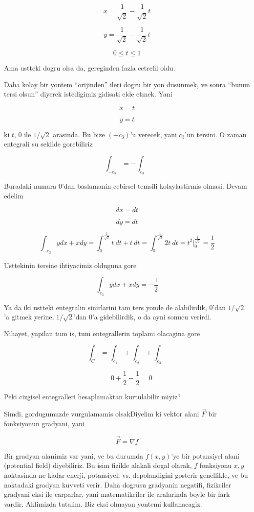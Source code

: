 \documentclass[12pt,fleqn]{article}
\begin{document}
\[ x = \frac{1}{\sqrt{2}} - \frac{1}{\sqrt{2}} t \]

\[ y = \frac{1}{\sqrt{2}} - \frac{1}{\sqrt{2}} t \]

\[ 0 \le t \le 1 \]

Ama ustteki dogru olsa da, gereginden fazla cetrefil oldu. 

Daha kolay bir yontem ``orijinden'' ileri dogru bir yon dusunmek, ve sonra
``bunun tersi olsun'' diyerek istedigimiz gidisati elde etmek. Yani

\[ x = t \]

\[ y = t \]

ki $t$, 0 ile $1/\sqrt{2}$ arasinda. Bu bize $(-c_3)$'u verecek, yani
$c_3$'un tersini. O zaman entegrali su sekilde gorebiliriz

\[ \int_{-c_3} = - \int_{c_3}  \]

Buradaki numara 0'dan baslamanin cebirsel temsili kolaylastirmis
olmasi. Devam edelim

\[ dx = dt \]

\[ dy = dt \]

\[ \int_{-c_3} y dx + x dy  = 
\int_{0}^{\frac{1}{\sqrt{2}}} t \ dt + t \ dt = 
\int_{0}^{\frac{1}{\sqrt{2}}} 2t \ dt = 
t^2 \bigg|_{0}^{\frac{1}{\sqrt{2}}} =
\frac{1}{2}
\]

Usttekinin tersine ihtiyacimiz olduguna gore 

\[ \int_{c_3} y dx + x dy  = -\frac{1}{2}
\]


Ya da iki ustteki entegralin sinirlarini tam ters yonde de alabilirdik,
0'dan $1/\sqrt{2}$'a gitmek yerine, $1/\sqrt{2}$'dan 0'a gidebilirdik, o da
ayni sonucu verirdi. 

Nihayet, yapilan tum is, tum entegrallerin toplami olacagina gore

\[ \int_C = \int_{c_1} + \int_{c_2} + \int_{c_3}  \]

\[ = 0 + \frac{1}{2} - \frac{1}{2} = 0\]

Peki cizgisel entegralleri hesaplamaktan kurtulabilir miyiz? 

Simdi, gordugumuzde vurgulamamis olsakDiyelim ki vektor alani $\vec{F}$ bir
fonksiyonun gradyani, yani

\[ \vec{F}  = \nabla f\]

Bir gradyan alanimiz var yani, ve bu durumda $f(x,y)$'ye bir potansiyel
alani (potential field) diyebiliriz. Bu isim fizikle alakali dogal olarak,
$f$ fonksiyonu $x,y$ noktasinda ne kadar enerji, potansiyel,
vs. depolandigini gosterir genellikle, ve bu noktadaki gradyan kuvveti
verir. Daha dogrusu gradyanin negatifi, fizikciler gradyani eksi ile
carparlar, yani matematikciler ile aralarinda boyle bir fark
vardir. Aklimizda tutalim. Biz eksi olmayan yontemi kullanacagiz.
\end{document}

